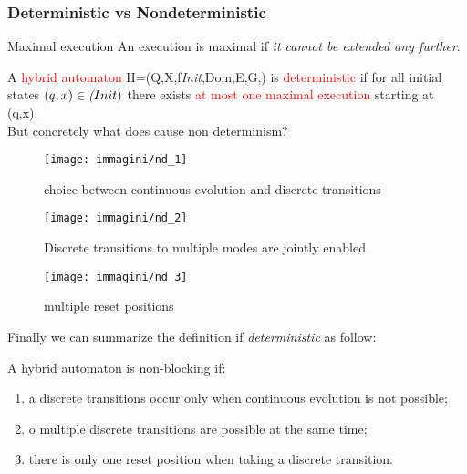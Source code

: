 \subsubsection{Deterministic vs Nondeterministic}
\begin{defn}{Maximal execution}
	An execution is maximal if \emph{it cannot be extended any further}.
\end{defn}
A \textcolor{red}{hybrid automaton} H=(Q,X,f\textit{Init},Dom,E,G,) is \textcolor{red}{deterministic} if for all initial states $(q,x) \in \emph(Init)$ there exists \textcolor{red}{at most one maximal execution} starting at (q,x).\\
But concretely what does cause non determinism?

\begin{SCfigure}[][h]
	\centering
	\texttt{[image: immagini/nd\_1]}
	\caption{choice between continuous evolution and discrete transitions}
	\label{fig:nd_1}
\end{SCfigure}
\begin{SCfigure}[][h]	
	\texttt{[image: immagini/nd\_2]}
	\caption{Discrete transitions to multiple modes are jointly enabled}
	\label{fig:nd_2}
\end{SCfigure}
\begin{SCfigure}[][!h]	
	\texttt{[image: immagini/nd\_3]}
	\caption{multiple reset positions}
	\label{fig:nd_3}
\end{SCfigure}
 Finally we can summarize the definition if \emph{deterministic} as follow: 
\begin{tcolorbox}
	A hybrid automaton is non-blocking if:
	\begin{enumerate}
		\item a discrete transitions occur only when continuous evolution is not possible;
		\item o multiple discrete transitions are possible at the same time;
		\item there is only one reset position when taking a discrete transition.
	\end{enumerate}
\end{tcolorbox}
